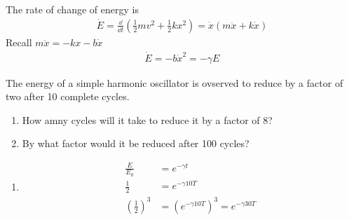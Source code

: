 \documentclass[a4paper]{article}
\numberwithin{equation}{section}
\begin{document}
The rate of change of energy is 
\begin{align}
    \dot E=\frac{\dd}{\dd t}\left(\frac{1}{2}mv^2+\frac{1}{2}kx^2\right)=\dot x(m\ddot x+k\dot x)
\end{align}
Recall $m\ddot x=-kx-b\dot x$
\begin{align}
    \dot E=-b\dot x^2=-\gamma E 
\end{align}

\begin{example}
    The energy of a simple harmonic oscillator is ovserved to reduce by a factor of two after 10 complete cycles.
    \begin{enumerate}
        \item How amny cycles will it take to reduce it by a factor of 8?
        \item By what factor would it be reduced after 100 cycles?
    \end{enumerate}
\end{example}
\begin{sol}
    \begin{enumerate}
        \item \begin{align}
            \frac{E}{E_0}&=e^{-\gamma t}\\
            \frac{1}{2}&=e^{-\gamma 10 T}\\
            \left(\frac{1}{2}\right)^3&=\left(e^{-\gamma 10 T}\right)^3=e^{-\gamma 30 T}
        \end{align}
    \end{enumerate}
\end{sol}
\end{document}
